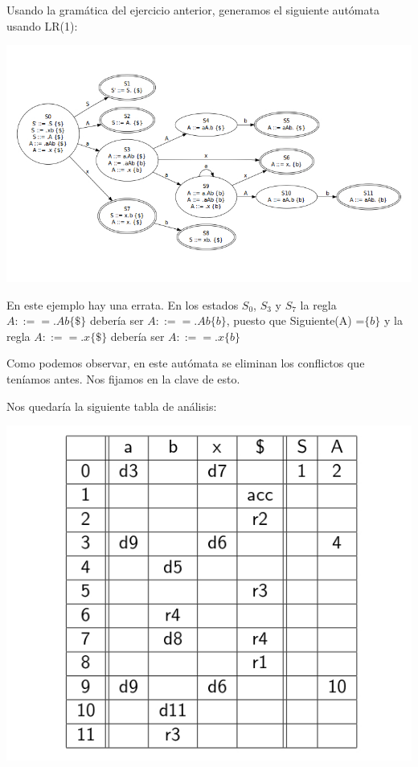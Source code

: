 \documentclass{apuntes}
\begin{document}
\begin{example}
Usando la gramática del ejercicio anterior, generamos el siguiente autómata usando LR(1):

\begin{center}
\includegraphics[scale=0.65]{img/automatalr1.jpg}
\end{center}
\obs En este ejemplo hay una errata. En los estados $S_0$, $S_3$ y $S_7$ la regla $A::== .Ab \{\$\}$ debería ser $A::== .Ab \{b\}$, puesto que Siguiente(A) =$\{b\}$ y la regla $A::== .x \{\$\}$ debería ser $A::== .x \{b\}$

Como podemos observar, en este autómata se eliminan los conflictos que teníamos antes. Nos fijamos en la clave de esto.

Nos quedaría la siguiente tabla de análisis:

\begin{center}
\includegraphics[scale=0.4]{img/tablaanalisislr1.jpg}
\end{center}
\end{example}
\end{document}
